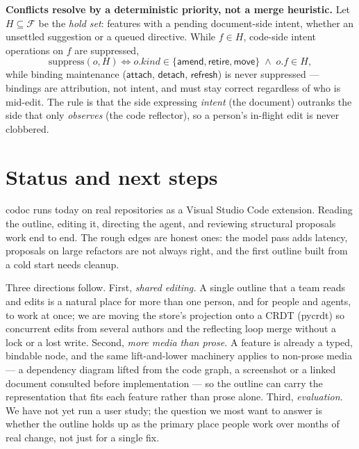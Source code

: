 \documentclass[sigconf,nonacm]{acmart}
\begin{document}
\textbf{Conflicts resolve by a deterministic priority, not a merge heuristic.}
Let $H \subseteq \mathcal{F}$ be the \emph{hold set}: features with a pending
document-side intent, whether an unsettled suggestion or a queued directive. While
$f \in H$, code-side intent operations on $f$ are suppressed,
\[
  \mathrm{suppress}(o, H) \iff
  o.\mathit{kind} \in \{\textsf{amend}, \textsf{retire}, \textsf{move}\}
  \;\wedge\; o.f \in H,
\]
while binding maintenance ($\textsf{attach}$, $\textsf{detach}$,
$\textsf{refresh}$) is never suppressed --- bindings are attribution, not intent,
and must stay correct regardless of who is mid-edit. The rule is that the side
expressing \emph{intent} (the document) outranks the side that only
\emph{observes} (the code reflector), so a person's in-flight edit is never
clobbered.

\section{Status and next steps}

codoc runs today on real repositories as a Visual Studio Code extension. Reading
the outline, editing it, directing the agent, and reviewing structural proposals
work end to end. The rough edges are honest ones: the model pass adds latency,
proposals on large refactors are not always right, and the first outline built
from a cold start needs cleanup.

Three directions follow. First, \emph{shared editing.} A single outline that a
team reads and edits is a natural place for more than one person, and for people
and agents, to work at once; we are moving the store's projection onto a CRDT
(pycrdt) so concurrent edits from several authors and the reflecting loop merge
without a lock or a lost write. Second, \emph{more media than prose.} A feature is
already a typed, bindable node, and the same lift-and-lower machinery applies to
non-prose media --- a dependency diagram lifted from the code graph, a screenshot
or a linked document consulted before implementation --- so the outline can carry
the representation that fits each feature rather than prose alone. Third,
\emph{evaluation.} We have not yet run a user study; the question we most want to
answer is whether the outline holds up as the primary place people work over
months of real change, not just for a single fix.
\end{document}
